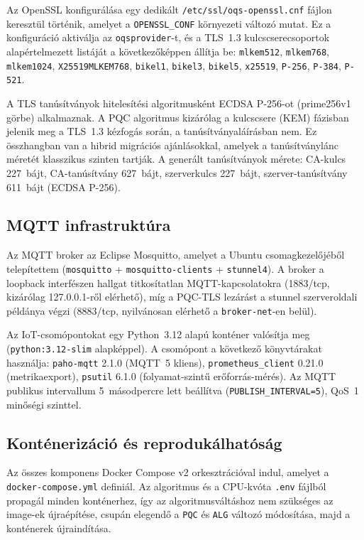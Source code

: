 Az OpenSSL konfigurálása egy dedikált \texttt{/etc/ssl/oqs-openssl.cnf} fájlon keresztül
történik, amelyet a \texttt{OPENSSL\_CONF} környezeti változó mutat. Ez a konfiguráció
aktiválja az \texttt{oqsprovider}-t, és a TLS~1.3 kulcscserecsoportok alapértelmezett
listáját a következőképpen állítja be: \texttt{mlkem512}, \texttt{mlkem768},
\texttt{mlkem1024}, \texttt{X25519MLKEM768}, \texttt{bikel1}, \texttt{bikel3},
\texttt{bikel5}, \texttt{x25519}, \texttt{P-256}, \texttt{P-384}, \texttt{P-521}.

A TLS tanúsítványok hitelesítési algoritmusként ECDSA P-256-ot (prime256v1 görbe) alkalmaznak.
A PQC algoritmus kizárólag a kulcscsere (KEM) fázisban jelenik meg a TLS~1.3 kézfogás
során, a tanúsítványaláírásban nem. Ez összhangban van a hibrid migrációs ajánlásokkal, amelyek
a tanúsítványlánc méretét klasszikus szinten tartják. A generált tanúsítványok mérete:
CA-kulcs 227~bájt, CA-tanúsítvány 627~bájt, szerverkulcs 227~bájt, szerver-tanúsítvány
611~bájt (ECDSA P-256).

\subsection{MQTT infrastruktúra}

Az MQTT broker az Eclipse Mosquitto, amelyet a Ubuntu csomagkezelőjéből telepítettem
(\texttt{mosquitto} + \texttt{mosquitto-clients} + \texttt{stunnel4}). A broker a loopback
interfészen hallgat titkosítatlan MQTT-kapcsolatokra (1883/tcp, kizárólag 127.0.0.1-ről
elérhető), míg a PQC-TLS lezárást a stunnel szerveroldali példánya végzi (8883/tcp, nyilvánosan
elérhető a \texttt{broker-net}-en belül).

Az IoT-csomópontokat egy Python~3.12 alapú konténer valósítja meg (\texttt{python:3.12-slim}
alapképpel). A csomópont a következő könyvtárakat használja:
\texttt{paho-mqtt} 2.1.0 (MQTT~5 kliens), \texttt{prometheus\_client} 0.21.0 (metrikaexport),
\texttt{psutil} 6.1.0 (folyamat-szintű erőforrás-mérés). Az MQTT publikus intervallum
5~másodpercre lett beállítva (\texttt{PUBLISH\_INTERVAL=5}), QoS~1 minőségi szinttel.

\subsection{Konténerizáció és reprodukálhatóság}

Az összes komponens Docker Compose v2 orkesztrációval indul, amelyet a \texttt{docker-compose.yml}
definiál. Az algoritmus és a CPU-kvóta \texttt{.env} fájlból propagál minden konténerhez,
így az algoritmusváltáshoz nem szükséges az image-ek újraépítése, csupán elegendő a
\texttt{PQC} és \texttt{ALG} változó módosítása, majd a konténerek újraindítása.

